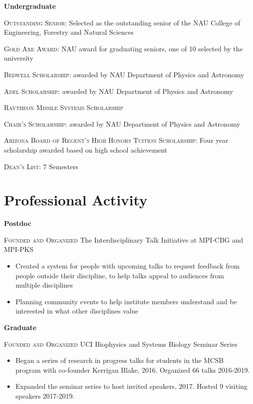 \documentclass[letterpaper,10pt]{article} %
\begin{document}
{\large \textbf{Undergraduate}}

\begin{description}[itemsep=-1ex]
\item \textsc{Outstanding Senior}: Selected as the outstanding senior of the NAU College of Engineering, Forestry and Natural Sciences
\item \textsc{Gold Axe Award}: NAU award for graduating seniors, one of 10 selected by the university
\item \textsc{Bedwell Scholarship}: awarded by NAU Department of Physics and Astronomy 
\item \textsc{Adel Scholarship}: awarded by NAU Department of Physics and Astronomy 
\item \textsc{Raytheon Missile Systems Scholarship}
\item \textsc{Chair's Scholarship}: awarded by NAU Department of Physics and Astronomy  
\item \textsc{Arizona Board of Regent's High Honors Tuition Scholarship}: Four year scholarship awarded based on high school achievement
\item \textsc{Dean's List}: 7 Semesters
\end{description}


\bigskip
\section*{Professional Activity}
\bigskip

{\large \textbf{Postdoc}}

\textsc{Founded and Organized} The Interdisciplinary Talk Initiative at MPI-CBG and MPI-PKS
\begin{itemize}
\item Created a system for people with upcoming talks to request feedback from people outside their discipline, to help talks appeal to audiences from multiple disciplines
\item Planning community events to help institute members understand and be interested in what other disciplines value
\end{itemize}

{\large \textbf{Graduate}}

\textsc{Founded and Organized} UCI Biophysics and Systems Biology Seminar Series
\begin{itemize}
\item Began a series of research in progress talks for students in the MCSB program with co-founder Kerrigan Blake, 2016. Organized 66 talks 2016-2019.
\item Expanded the seminar series to host invited speakers, 2017. Hosted 9 visiting speakers 2017-2019.
\end{itemize}
\end{document}
